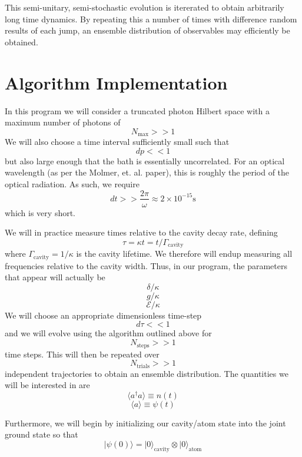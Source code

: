 \documentclass[11pt, oneside]{article}
\begin{document}
This semi-unitary, semi-stochastic evolution is itererated to obtain arbitrarily long time dynamics. By repeating this a number of times with difference random results of each jump, an ensemble distribution of observables may efficiently be obtained. 

\section{Algorithm Implementation}
In this program we will consider a truncated photon Hilbert space with a maximum number of photons of 
\[
N_{\textrm{max}} >>1
\]
We will also choose a time interval sufficiently small such that 
\[
dp << 1
\]
but also large enough that the bath is essentially uncorrelated. For an optical wavelength (as per the Molmer, et. al. paper), this is roughly the period of the optical radiation. As such, we require 
\[
dt >> \frac{2\pi}{\omega} \approx 2\times 10^{-15} \si{\s}
\]
which is very short.  

We will in practice measure times relative to the cavity decay rate, defining 
\[
\tau = \kappa t = t/\Gamma_{\textrm{cavity}}
\]
where $\Gamma_{\textrm{cavity}} = 1/\kappa$ is the cavity lifetime. We therefore will endup measuring all frequencies relative to the cavity width. Thus, in our program, the parameters that appear will actually be 
\[
\delta/\kappa
\]
\[
g/\kappa
\]
\[
\mathcal{E}/\kappa
\]
We will choose an appropriate dimensionless time-step 
\[
d\tau <<1
\]
and we will evolve using the algorithm outlined above for 
\[
N_{\textrm{steps}} >>1 
\]
time steps. This will then be repeated over 
\[
N_{\textrm{trials}} >>1 
\]
independent trajectories to obtain an ensemble distribution. The quantities we will be interested in are 
\[
\langle a^\dagger a \rangle \equiv n(t)
\]
\[
 \langle a \rangle \equiv \psi(t)
\]

Furthermore, we will begin by initializing our cavity/atom state into the joint ground state so that 
\[
|\psi(0)\rangle = |0\rangle_{\textrm{cavity}}\otimes |0\rangle_{\textrm{atom}}
\]
 
\end{document}
